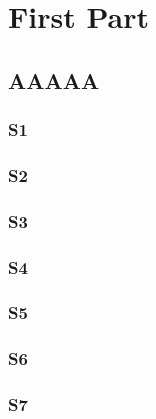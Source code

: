 \documentclass[12pt,a4paper]{report} %
\begin{document}
\mtcpagenumbers
\noptcrule
\dominitoc
\dominilof[c]                   %
\dominilot
\doparttoc                      %
\dopartlof                      %
\dopartlot                      %
\tableofcontents            %
\listoffigures              %
\fakelistoftables           %
\part{First Part}
\parttoc
\partlof[r]
\partlot[r]
\twocolumn\sloppy               %
\chapter{AAAAA}                 %
\minitoc[r]                     %
\lipsum[1]
\section{S1}
\lipsum[2]
\section{S2}
\lipsum[3]
\section{S3}
\lipsum[4]
\section*{S4}
\lipsum[5]
\section{S5}
\lipsum[6]
\section{S6}
\lipsum[6]
\section{S7}
\lipsum[7]
\end{document}

